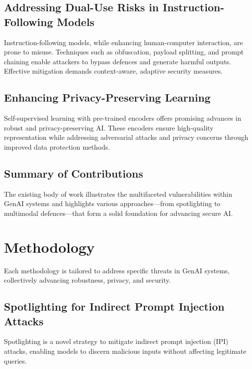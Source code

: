 \documentclass[journal]{IEEEtran}  %
\begin{document}
\subsection{Addressing Dual-Use Risks in Instruction-Following Models}
Instruction-following models, while enhancing human-computer interaction, are prone to misuse. Techniques such as obfuscation, payload splitting, and prompt chaining enable attackers to bypass defences and generate harmful outputs. Effective mitigation demands context-aware, adaptive security measures.

\subsection{Enhancing Privacy-Preserving Learning}
Self-supervised learning with pre-trained encoders offers promising advances in robust and privacy-preserving AI. These encoders ensure high-quality representation while addressing adversarial attacks and privacy concerns through improved data protection methods.

\subsection*{Summary of Contributions}
The existing body of work illustrates the multifaceted vulnerabilities within GenAI systems and highlights various approaches—from spotlighting to multimodal defences—that form a solid foundation for advancing secure AI.

\section{Methodology}

Each methodology is tailored to address specific threats in GenAI systems, collectively advancing robustness, privacy, and security.

\subsection{Spotlighting for Indirect Prompt Injection Attacks}
Spotlighting is a novel strategy to mitigate indirect prompt injection (IPI) attacks, enabling models to discern malicious inputs without affecting legitimate queries.
\end{document}
